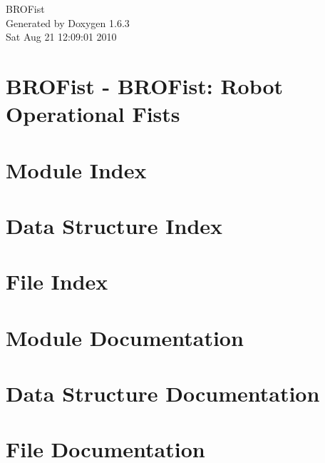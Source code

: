 \documentclass[a4paper]{book}
\begin{document}
\hypersetup{pageanchor=false}
\begin{titlepage}
\vspace*{7cm}
\begin{center}
{\Large BROFist }\\
\vspace*{1cm}
{\large Generated by Doxygen 1.6.3}\\
\vspace*{0.5cm}
{\small Sat Aug 21 12:09:01 2010}\\
\end{center}
\end{titlepage}
\clearemptydoublepage
{}
\tableofcontents
\clearemptydoublepage
{}
\hypersetup{pageanchor=true}
\chapter{BROFist -\/ BROFist: Robot Operational Fists}
\label{index}\hypertarget{index}{}
\chapter{Module Index}

\chapter{Data Structure Index}

\chapter{File Index}

\chapter{Module Documentation}

















\chapter{Data Structure Documentation}






\chapter{File Documentation}








\printindex
\end{document}
